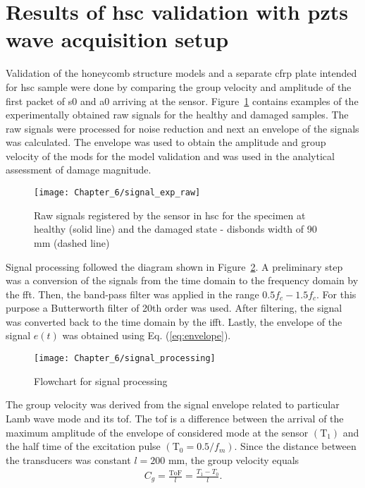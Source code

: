 \section{Results of \acl{hsc} validation with \aclp{pzt} wave acquisition setup}
\label{sec:resuls_pzt}
Validation of the honeycomb structure models and a separate \ac{cfrp} plate intended for \ac{hsc} sample were done by comparing the group velocity and amplitude of the first packet of \ac{s0} and \ac{a0} arriving at the sensor.
Figure~\ref{fig:signal_exp_raw} contains examples of the experimentally obtained raw signals for the healthy and damaged samples.
The raw signals were processed for noise reduction and next an envelope of the signals was calculated.
The envelope was used to obtain the amplitude and group velocity of the mods for the model validation and was used in the analytical assessment of damage magnitude.
\begin{figure}[!htb]
	\begin{center}
		\texttt{[image: Chapter\_6/signal\_exp\_raw]}
	\end{center}
	\caption{Raw signals registered by the sensor in \acl{hsc} for the specimen at healthy (solid line) and the damaged state - disbonds width of 90 \unit{\mm} (dashed line)}
	\label{fig:signal_exp_raw}
\end{figure}
\pagebreak

Signal processing followed the diagram shown in Figure~\ref{fig:signal_processing}.
A preliminary step was a conversion of the signals from the time domain to the frequency domain by the \ac{fft}.
Then, the band-pass filter was applied in the range \(0.5f_c-1.5f_c\).
For this purpose a Butterworth filter of 20th order was used.
After filtering, the signal was converted back to the time domain by the \ac{ifft}.
Lastly, the envelope of the signal \(e(t)\) was obtained using Eq. (\ref{eq:envelope}).

\begin{figure}[!htb]
	\begin{center}
		\texttt{[image: Chapter\_6/signal\_processing]}
	\end{center}
	\caption{Flowchart for signal processing}
	\label{fig:signal_processing}
\end{figure}

The group velocity was derived from the signal envelope related to particular Lamb wave mode and its \ac{tof}.
The \ac{tof} is a difference between the arrival of the maximum amplitude of the envelope of considered mode at the sensor \((\mathrm{T}_1)\) and the half time of the excitation pulse \(\left(\mathrm{T}_0=0.5/f_m\right)\).
Since the distance between the transducers was constant \(l=200\) \unit{\mm}, the group velocity equals
\begin{eqnarray}
	C_g = \frac{\mathrm{ToF}}{l}=\frac{T_1-T_0}{l}.
\end{eqnarray}

